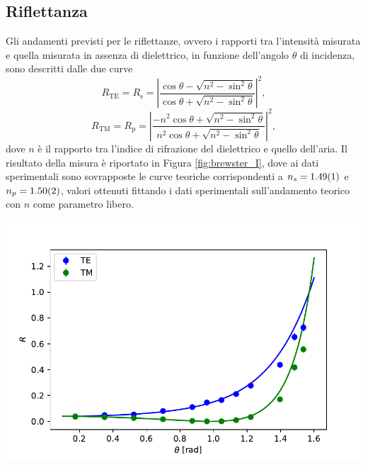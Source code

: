 \documentclass[10pt,oneside,a4paper]{article}
\newenvironment{Figure}
  {\par\medskip\noindent\minipage{\linewidth}}
  {\endminipage\par\medskip}
\begin{document}
\begin{multicols}{2}
\subsection{Riflettanza}
Gli andamenti previsti per le riflettanze, ovvero i rapporti tra l'intensità misurata e quella misurata in assenza di dielettrico, in funzione dell'angolo $\theta$ di incidenza, sono descritti dalle due curve
\begin{equation}\label{eq:rs}
	R_{\mathrm{TE}} = R_\mathrm{s} = \left\vert \frac{\cos \theta - \sqrt{n^2 - \sin^2 \theta}}{\cos \theta + \sqrt{n^2 - \sin^2 \theta}} \right\vert^2,
\end{equation}
\begin{equation}\label{eq:rs}
	R_{\mathrm{TM}} = R_\mathrm{p} =  \left\vert \frac{-n^2 \cos \theta + \sqrt{n^2 - \sin^2 \theta}}{n^2 \cos \theta + \sqrt{n^2 - \sin^2 \theta}} \right\vert^2,
\end{equation}
dove $n$ è il rapporto tra l'indice di rifrazione del dielettrico e quello dell'aria.
Il risultato della misura è riportato in Figura \ref{fig:brewster_I}, dove ai dati sperimentali sono sovrapposte le curve teoriche corrispondenti a $n_s = \SI{1.49 \pm 0.01}{}$ e $n_p = \SI{1.50 \pm 0.02}{}$, valori ottenuti fittando i dati sperimentali sull'andamento teorico con $n$ come parametro libero.
\begin{Figure}
	\begin{center}
	\includegraphics[width=\linewidth]{riflettanze.pdf}
	\label{fig:brewster_I}
	\end{center}
\end{Figure}


\end{multicols}
\end{document}
